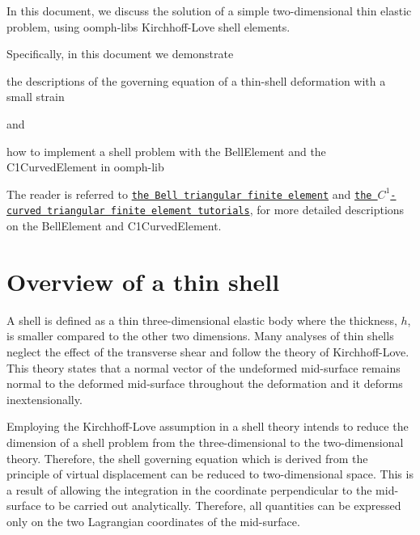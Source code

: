 In this document, we discuss the solution of a simple two-\/dimensional thin elastic problem, using oomph-\/lib\textquotesingle{}s Kirchhoff-\/\+Love shell elements.

Specifically, in this document we demonstrate


\begin{DoxyItemize}
\item the descriptions of the governing equation of a thin-\/shell deformation with a small strain
\end{DoxyItemize}and
\begin{DoxyItemize}
\item how to implement a shell problem with the {\ttfamily Bell\+Element} and the {\ttfamily C1\+Curved\+Element} in {\ttfamily oomph-\/lib} 
\end{DoxyItemize}The reader is referred to \href{../../../c1_element/bell_element/html/index.html}{\tt the Bell triangular finite element} and \href{../../../c1_element/curved_element/html/index.html}{\tt the $ C^1 $-\/curved triangular finite element tutorials}, for more detailed descriptions on the {\ttfamily Bell\+Element} and {\ttfamily C1\+Curved\+Element}.



 

\hypertarget{index_overview}{}\section{Overview of a thin shell}\label{index_overview}
A shell is defined as a thin three-\/dimensional elastic body where the thickness, $ h $, is smaller compared to the other two dimensions. Many analyses of thin shells neglect the effect of the transverse shear and follow the theory of Kirchhoff-\/\+Love. This theory states that a normal vector of the undeformed mid-\/surface remains normal to the deformed mid-\/surface throughout the deformation and it deforms inextensionally.

Employing the Kirchhoff-\/\+Love assumption in a shell theory intends to reduce the dimension of a shell problem from the three-\/dimensional to the two-\/dimensional theory. Therefore, the shell governing equation which is derived from the principle of virtual displacement can be reduced to two-\/dimensional space. This is a result of allowing the integration in the coordinate perpendicular to the mid-\/surface to be carried out analytically. Therefore, all quantities can be expressed only on the two Lagrangian coordinates of the mid-\/surface.


